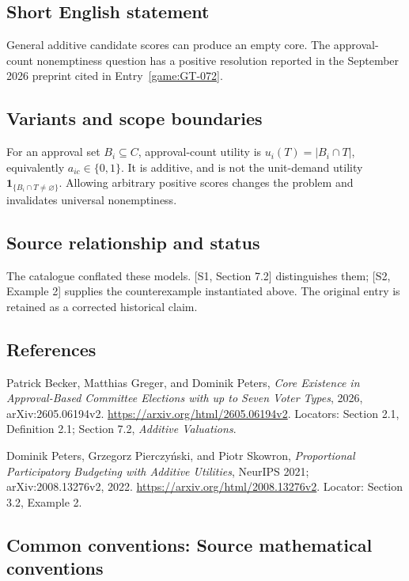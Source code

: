 \documentclass[11pt,a4paper]{article}
\begin{document}
\subsection*{Short English statement}
General additive candidate scores can produce an empty core.
The approval-count nonemptiness question has a positive resolution reported
in the September 2026 preprint cited in Entry~\ref{game:GT-072}.

\subsection*{Variants and scope boundaries}
For an approval set \(B_i\subseteq C\), approval-count utility is
\(u_i(T)=|B_i\cap T|\), equivalently \(a_{ic}\in\{0,1\}\).
It is additive, and is not the unit-demand utility
\(\mathbf 1_{\{B_i\cap T\ne\varnothing\}}\).
Allowing arbitrary positive scores changes the problem and invalidates
universal nonemptiness.

\subsection*{Source relationship and status}
The catalogue conflated these models. [S1, Section 7.2] distinguishes
them; [S2, Example 2] supplies the counterexample instantiated above.
The original entry is retained as a corrected historical claim.

\subsection*{References}
\begingroup\footnotesize\raggedright
\noindent[S1] Patrick Becker, Matthias Greger, and Dominik Peters,
\emph{Core Existence in Approval-Based Committee Elections with up to
Seven Voter Types}, 2026, arXiv:2605.06194v2.
\url{https://arxiv.org/html/2605.06194v2}.
Locators: Section 2.1, Definition 2.1; Section 7.2, \emph{Additive Valuations}.

\noindent[S2] Dominik Peters, Grzegorz Pierczy\'nski, and Piotr Skowron,
\emph{Proportional Participatory Budgeting with Additive Utilities},
NeurIPS 2021; arXiv:2008.13276v2, 2022.
\url{https://arxiv.org/html/2008.13276v2}.
Locator: Section 3.2, Example 2.
\par\endgroup

\subsection*{Common conventions: Source mathematical conventions}
\end{document}
